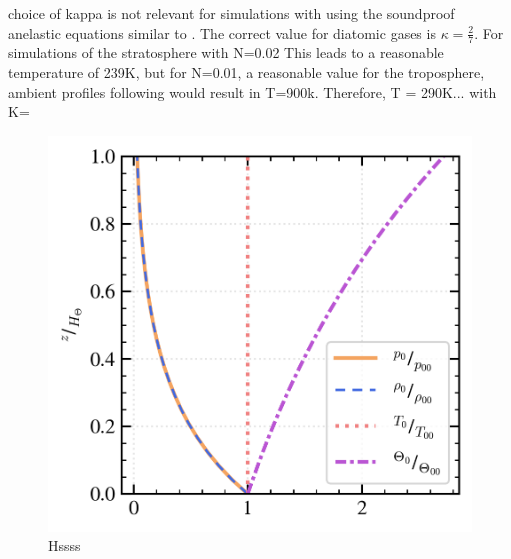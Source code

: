 choice of kappa is not relevant for simulations with using the soundproof anelastic equations similar to \textcite[]{lipps_scale_1982}. The correct value for diatomic gases is $\kappa=\frac{2}{7}$. For simulations of the stratosphere with N=0.02 This leads to a reasonable temperature of 239K, but for N=0.01, a reasonable value for the troposphere, ambient profiles following \textcite{bacmeister_breakdown_1989} would result in T=900k. Therefore, T = 290K... with K=

\begin{figure}[tbp]
    \centering
    \includegraphics[]{figures_model/bac-schoeber-ambient-profiles.png}
    \caption{Hssss}
    \label{fig:ambient_profs}
\end{figure} 

